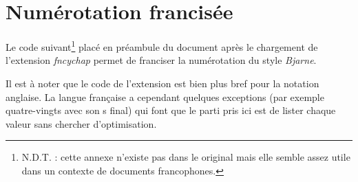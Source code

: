 \documentclass{report}
\begin{document}
  \appendix
  \chapter{Numérotation francisée} \label{france}

    Le code suivant\footnote{N.D.T. : cette annexe n'existe pas dans le
    original mais elle semble assez utile dans un contexte de documents 
    francophones.} placé en préambule du document après le chargement de 
    l'extension \textsl{fncychap} permet de franciser la numérotation du style
    \emph{Bjarne}. 

    Il est à noter que le code de l'extension est bien plus bref pour la 
    notation anglaise. La langue française a cependant quelques exceptions (par
    exemple \og quatre-vingts \fg{} avec son \og s \fg{} final) qui font que le
    parti pris ici est de lister chaque valeur sans chercher d'optimisation.
\end{document}
